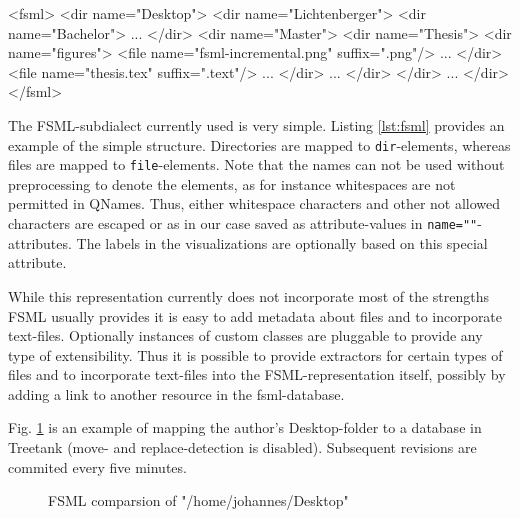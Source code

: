 \begin{code}[caption=FSML structure]
<fsml>
  <dir name="Desktop">
    <dir name="Lichtenberger">
      <dir name="Bachelor">
        ...
      </dir>
      <dir name="Master">
        <dir name="Thesis">
          <dir name="figures">
            <file name="fsml-incremental.png" suffix=".png"/>
            ...
          </dir>
          <file name="thesis.tex" suffix=".text"/>
          ...
        </dir>
        ...
      </dir>
    </dir>
    ...
  </dir>
</fsml>
\end{code}
\label{lst:fsml}

The FSML-subdialect currently used is very simple. Listing \ref{lst:fsml} provides an example of the simple structure. Directories are mapped to \texttt{dir}-elements, whereas files are mapped to \texttt{file}-elements. Note that the names can not be used without preprocessing to denote the elements, as for instance whitespaces are not permitted in QNames. Thus, either whitespace characters and other not allowed characters are escaped or as in our case saved as attribute-values in \texttt{name=""}-attributes. The labels in the visualizations are optionally based on this special attribute.

While this representation currently does not incorporate most of the strengths FSML usually provides it is easy to add metadata about files and to incorporate text-files. Optionally instances of custom classes are pluggable to provide any type of extensibility. Thus it is possible to provide extractors for certain types of files and to incorporate text-files into the FSML-representation itself, possibly by adding a link to another resource in the fsml-database.

Fig. \ref{fig:fsml-itemsize-pruning} is an example of mapping the author's Desktop-folder to a database in Treetank (move- and replace-detection is disabled). Subsequent revisions are commited every five minutes.

\begin{figure}[tb]
\caption{\label{fig:fsml-itemsize-pruning} FSML comparsion of "/home/johannes/Desktop"}
\end{figure}

